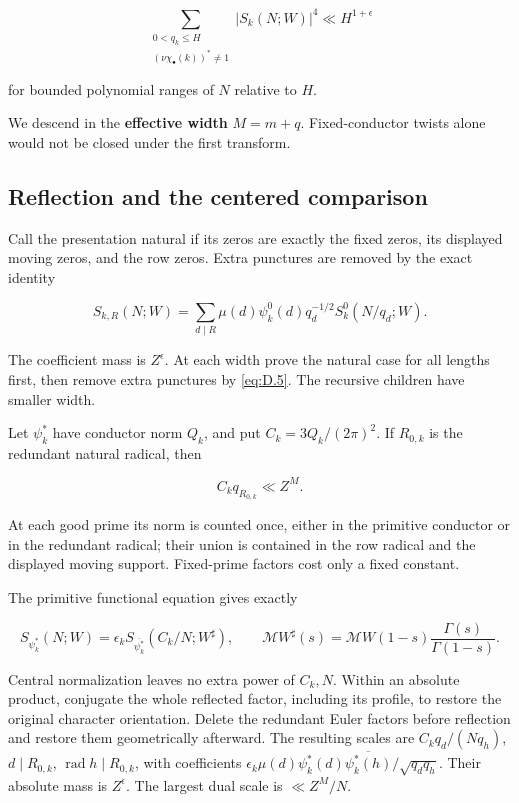 \documentclass[11pt,a4paper]{article}
\begin{document}
\[
\sum_{\substack{0<q_k\le H\\(\nu\chi_\bullet(k))^*\ne1}}
 |S_k(N;W)|^4\ll H^{1+\epsilon}
\tag{D.4}\label{eq:D.4}
\]

for bounded polynomial ranges of \(N\) relative to \(H\).

We descend in the \textbf{effective width} \(M=m+q\). Fixed-conductor twists alone would not be closed under the first transform.

\subsection{Reflection and the centered comparison}\label{sec:D.3}

Call the presentation natural if its zeros are exactly the fixed zeros, its displayed moving zeros, and the row zeros. Extra punctures are removed by the exact identity

\[
S_{k,R}(N;W)=\sum_{d\mid R}\mu(d)\psi_k^0(d)q_d^{-1/2}S_k^0(N/q_d;W).
\tag{D.5}\label{eq:D.5}
\]

The coefficient mass is \(Z^\epsilon\). At each width prove the natural case for all lengths first, then remove extra punctures by \eqref{eq:D.5}. The recursive children have smaller width.

Let \(\psi_k^*\) have conductor norm \(Q_k\), and put \(C_k=3Q_k/(2\pi)^2\). If \(R_{0,k}\) is the redundant natural radical, then

\[
C_kq_{R_{0,k}}\ll Z^M.
\tag{D.6}\label{eq:D.6}
\]

At each good prime its norm is counted once, either in the primitive conductor or in the redundant radical; their union is contained in the row radical and the displayed moving support. Fixed-prime factors cost only a fixed constant.

The primitive functional equation gives exactly

\[
S_{\psi_k^*}(N;W)=\epsilon_k S_{\overline{\psi_k^*}}(C_k/N;W^\sharp),\qquad
\mathcal MW^\sharp(s)=\mathcal MW(1-s)\frac{\Gamma(s)}{\Gamma(1-s)}.
\tag{D.7}\label{eq:D.7}
\]

Central normalization leaves no extra power of \(C_k,N\). Within an absolute product, conjugate the whole reflected factor, including its profile, to restore the original character orientation. Delete the redundant Euler factors before reflection and restore them geometrically afterward. The resulting scales are \(C_kq_d/(Nq_h)\), \(d\mid R_{0,k}\), \(\operatorname{rad}h\mid R_{0,k}\), with coefficients \(\epsilon_k\mu(d)\psi_k^*(d)\overline{\psi_k^*(h)}/\sqrt{q_dq_h}\). Their absolute mass is \(Z^\epsilon\). The largest dual scale is \(\ll Z^M/N\).
\end{document}
